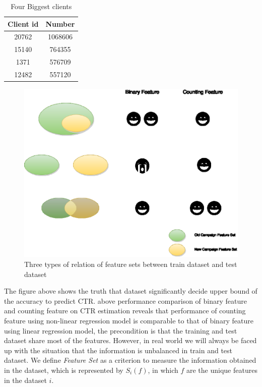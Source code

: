 \documentclass{sig-alternate}
\begin{document}
\begin{table}[h]
 \centering
 \begin{tabular}{ ||c c || } 
 \hline
 Client id  & Number \\
 \hline
 20762 & 1068606 \\ 
  15140 & 764355 \\ 
   1371 & 576709 \\ 
   12482 & 557120\\
 \hline
 \end{tabular}
 \caption{Four Biggest clients}
 \label{tab:campainid}
 \end{table}


\begin{figure}[h]
\centering
\includegraphics[width=\columnwidth]{Datasetbias.eps}
\caption{Three types of relation of feature sets between train dataset and test dataset}
\label{fig:datasetbias}
\end{figure}

The figure above shows the truth that dataset significantly decide upper bound of the accuracy to predict CTR. above performance comparison of binary feature and counting feature on CTR estimation reveals that performance of counting feature using non-linear regression model is comparable to that of binary feature using linear regression model, the precondition is that the training and test dataset share most of the features. However, in real world we will always be faced up with the situation that the information is unbalanced in train and test dataset. We define \textit{Feature Set} as a criterion to measure the information obtained in the dataset, which is represented by  \(S_i(f)\), in which \(f\) are the unique features in the dataset \(i\).\vspace{5mm}
\end{document}
